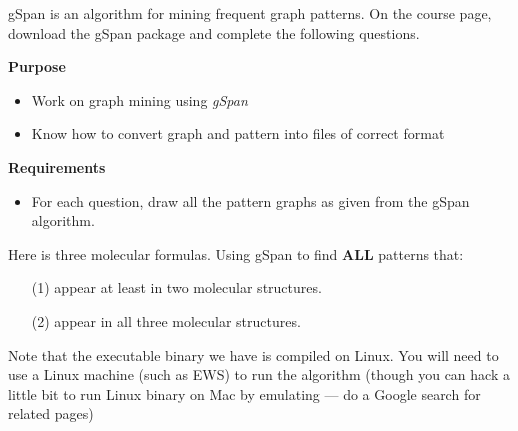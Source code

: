 gSpan is an algorithm for mining frequent graph patterns. On the course page, download the gSpan package and complete the following questions.

\textbf{Purpose} 
\begin{itemize}\vspace{-2mm}\setlength\itemsep{-1mm}
\item Work on graph mining using \textit{gSpan}
\item Know how to convert graph and pattern into files of correct format
\end{itemize}

\textbf{Requirements}
\begin{itemize}\vspace{-2mm}\setlength\itemsep{-1mm}
\item For each question, draw all the pattern graphs as given from the gSpan algorithm.
\end{itemize}

Here is three molecular formulas. Using gSpan to find \textbf{ALL} patterns that:
\begin{itemize}
\item[(1)] appear at least in two molecular structures.
\item[(2)] appear in all three molecular structures.
\end{itemize}

Note that the executable binary we have is compiled on Linux. You will need to use a Linux machine (such as EWS) to run the algorithm (though you can hack a little bit to run Linux binary on Mac by emulating --- do a Google search for related pages)
    

